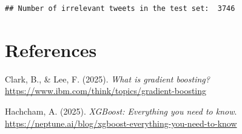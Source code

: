 \documentclass[
]{article}
\newenvironment{Shaded}{\begin{snugshade}}{\end{snugshade}}
\newcommand{\DecValTok}[1]{\textcolor[rgb]{0.00,0.00,0.81}{#1}}
\newcommand{\FunctionTok}[1]{\textcolor[rgb]{0.13,0.29,0.53}{\textbf{#1}}}
\newcommand{\NormalTok}[1]{#1}
\newcommand{\SpecialCharTok}[1]{\textcolor[rgb]{0.81,0.36,0.00}{\textbf{#1}}}
\newcommand{\StringTok}[1]{\textcolor[rgb]{0.31,0.60,0.02}{#1}}
\newlength{\cslhangindent}
\newenvironment{CSLReferences}[2] %
 {\begin{list}{}{%
  \setlength{\itemindent}{0pt}
  \setlength{\leftmargin}{0pt}
  \setlength{\parsep}{0pt}
  \ifodd #1
   \setlength{\leftmargin}{\cslhangindent}
   \setlength{\itemindent}{-1\cslhangindent}
  \fi
  \setlength{\itemsep}{#2\baselineskip}}}
 {\end{list}}
\begin{document}
\begin{Shaded}
\end{Shaded}

\begin{verbatim}
## Number of irrelevant tweets in the test set:  3746
\end{verbatim}

\newpage

\section*{References}\label{references}

\label{refs}
\begin{CSLReferences}{1}{0}
Clark, B., \& Lee, F. (2025). \emph{What is gradient boosting?}
\url{https://www.ibm.com/think/topics/gradient-boosting}

Hachcham, A. (2025). \emph{XGBoost: Everything you need to know}.
\url{https://neptune.ai/blog/xgboost-everything-you-need-to-know}

\end{CSLReferences}
\end{document}
